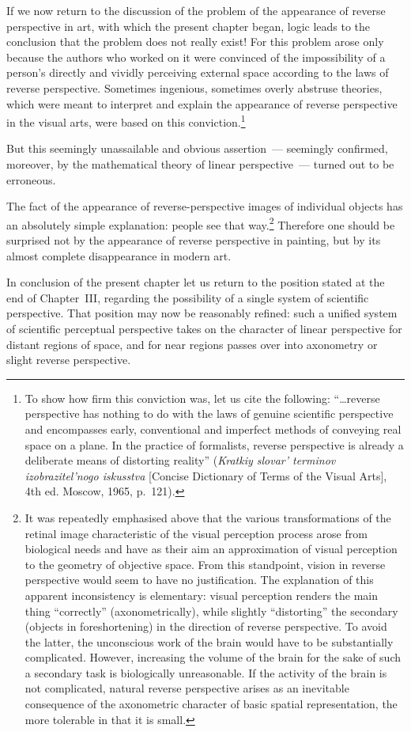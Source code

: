 If we now return to the discussion of the problem of the appearance of reverse
perspective in art, with which the present chapter began, logic leads to the
conclusion that the problem does not really exist!  For this problem arose only
because the authors who worked on it were convinced of the impossibility of a person's
directly and vividly perceiving external space according to the laws of reverse
perspective.  Sometimes ingenious, sometimes overly abstruse theories, which were
meant to interpret and explain the appearance of reverse perspective in the visual
arts, were based on this conviction.\footnote{To show how firm this conviction was,
  let us cite the following: ``\ldots{}reverse perspective has nothing to do with
  the laws of genuine scientific perspective and encompasses early, conventional and
  imperfect methods of conveying real space on a plane.  In the practice of
  formalists, reverse perspective is already a deliberate means of distorting
  reality'' (\emph{Kratkiy slovar' terminov izobrazitel'nogo iskusstva} [Concise
  Dictionary of Terms of the Visual Arts], 4th ed.  Moscow, 1965, p.~121).}


But this seemingly unassailable and obvious assertion~--- seemingly confirmed, moreover,
by the mathematical theory of linear perspective~--- turned out to be erroneous.

The fact of the appearance of reverse-perspective images of individual objects has an
absolutely simple explanation: people see that way.\footnote{It was repeatedly
  emphasised above that the various transformations of the retinal image characteristic
  of the visual perception process arose from biological needs and have as their aim
  an approximation of visual perception to the geometry of objective space.  From this
  standpoint, vision in reverse perspective would seem to have no justification.  The
  explanation of this apparent inconsistency is elementary: visual perception renders
  the main thing ``correctly'' (axonometrically), while slightly ``distorting'' the
  secondary (objects in foreshortening) in the direction of reverse perspective.  To
  avoid the latter, the unconscious work of the brain would have to be substantially
  complicated.  However, increasing the volume of the brain for the sake of such a
  secondary task is biologically unreasonable.  If the activity of the brain is not
  complicated, natural reverse perspective arises as an inevitable consequence of the
  axonometric character of basic spatial representation, the more tolerable in that it
  is small.}
Therefore one should be surprised not by the appearance of reverse perspective in
painting, but by its almost complete disappearance in modern art.

In conclusion of the present chapter let us return to the position stated at the end
of Chapter~III, regarding the possibility of a single system of scientific
perspective.  That position may now be reasonably refined: such a unified system of
scientific perceptual perspective takes on the character of linear perspective for
distant regions of space, and for near regions passes over into axonometry or slight
reverse perspective.
